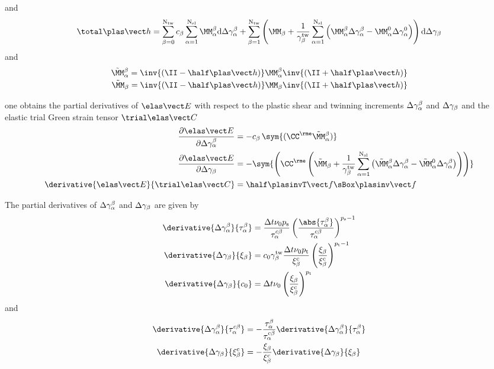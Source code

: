   and
  \begin{equation}
      \dhhp =  \sumbONtw \cb \sumaNsl \MMab \rmd \Delta \gammaab + \sumbNtw \left(\MMb + \frac{1}{\gammatwb}\sumaNsl\left(\MMab\Delta\gammaab-\MMaO\Delta\gammaaO\right)\right)  \rmd \Delta \gammab
      \label{eq:dhhp}
  \end{equation}
  and 
  \begin{equation}
    \begin{split}
      \MMabtilde = \inv{\IIminus} \MMab \inv{\IIplus} \\
      \MMbtilde = \inv{\IIminus} \MMb \inv{\IIplus}
    \end{split}
  \end{equation}
  
  one obtains the partial derivatives of $\EEe$ with respect to the plastic shear and twinning increments $\Delta\gamma^{\beta}_{\alpha}$ and $\Delta\gamma_{\beta}$ and the elastic trial Green strain tensor $\CCetr$
  \begin{align}
    \dEEeDDeltagammaab &= - \cb \, \sym{(\CCe \MMabtilde)} \label{eq:dEEeDDeltagammaab}\\
    \dEEeDDeltagammab &= - \sym{\left(\CCe \left(\MMbtilde+\frac{1}{\gammatwb}\sumaNsl \left(\MMabtilde\Delta\gammaab-\MMaOtilde\Delta\gammaab\right)\right)\right)} \label{eq:dEEeDDeltagammab}\\
    \derivative{\EEe}{\CCetr} &= \half \ffpinvT \sBox \ffpinv
  \end{align}
  
  The partial derivatives of $\Delta\gamma^{\beta}_{\alpha}$ and $\Delta\gamma_{\beta}$ are given by 
  \begin{align}
    \derivative{\Delta\gammaab}{\tauab} &= \frac{\Dt \nu_0 \psl}{\tauacb} \left(\frac{\abs{\tauab}}{\tauacb} \right)^{\psl-1} \\
    \derivative{\Delta\gammab}{\xib} &= c_0 \gammatwb \frac{\Dt \nu_0 \ptw}{\xibc} \left(\frac{\xib}{\xibc} \right)^{\ptw-1} \\
    \derivative{\Delta\gammab}{c_0} &= \Dt \nu_0 \left(\frac{\xib}{\xibc} \right)^{\ptw}
  \end{align}
  and
  \begin{align}
    \derivative{\Delta\gammaab}{\tauacb} &= - \frac{\tauab}{\tauacb} \derivative{\Delta\gammaab}{\tauab} \\
    \derivative{\Delta\gammab}{\xibc} &= -\frac{\xib}{\xibc} \derivative{\Delta\gammab}{\xib}
  \end{align}
  
